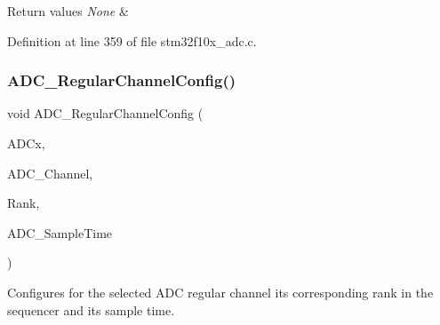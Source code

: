 \begin{DoxyRetVals}{Return values}
{\em None} & \\
\hline
\end{DoxyRetVals}


Definition at line 359 of file stm32f10x\+\_\+adc.\+c.

\mbox{\label{group___a_d_c___exported___functions_gac531adb577b648d4bb8881f2ed627d52}} 
\subsubsection{\texorpdfstring{A\+D\+C\+\_\+\+Regular\+Channel\+Config()}{ADC\_RegularChannelConfig()}}
{\footnotesize\ttfamily void A\+D\+C\+\_\+\+Regular\+Channel\+Config (\begin{DoxyParamCaption}\item[{\hyperlink{struct_a_d_c___type_def}{A\+D\+C\+\_\+\+Type\+Def} $\ast$}]{A\+D\+Cx,  }\item[{uint8\+\_\+t}]{A\+D\+C\+\_\+\+Channel,  }\item[{uint8\+\_\+t}]{Rank,  }\item[{uint8\+\_\+t}]{A\+D\+C\+\_\+\+Sample\+Time }\end{DoxyParamCaption})}



Configures for the selected A\+DC regular channel its corresponding rank in the sequencer and its sample time. 


